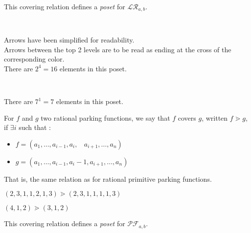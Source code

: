 \begin{prop}
    This covering relation defines a \emph{poset}
    for $\mathcal{LR}_{a,b}$.
\end{prop}

\begin{example}
    ~\\
    \begin{center}
        
        Arrows have been simplified for readability.\\
        Arrows between the top 2 levels are to be read
        as ending at the cross of the corresponding color.\\
        There are $2^4 = 16$ elements in this poset.
    \end{center}
\end{example}


\begin{example}
    ~\\
    \begin{center}
        
        There are $7^1 = 7$ elements in this poset.
    \end{center}
\end{example}

\begin{definition}[$\gtrdot$]
    For $f$ and $g$ two rational parking functions, we say
    that $f$ covers $g$, written $f \gtrdot g$, if
    $\exists i$ such that :
    \begin{itemize}
        \item $f = (a_1, \ldots, a_{i-1}, a_i,\ \ \ \ 
            a_{i+1}, \ldots, a_n)$
        \item $g = (a_1, \ldots, a_{i-1}, a_i - 1, a_{i+1},
        \ldots, a_n)$
    \end{itemize}
    That is, the same relation as for rational primitive
    parking functions.
\end{definition}

\begin{example}[$a > b : a = 7, b = 3$]
    $(2, 3, 1, 1, 2, 1, 3) \gtrdot (2, 3, 1, 1, 1, 1, 3)$    
\end{example}

\begin{example}[$a < b : a = 3, b = 5$]
    $(4, 1, 2) \gtrdot (3, 1, 2)$    
\end{example}

\begin{prop}
    This covering relation defines a \emph{poset}
    for $\mathcal{PF}_{a,b}$.
\end{prop}

